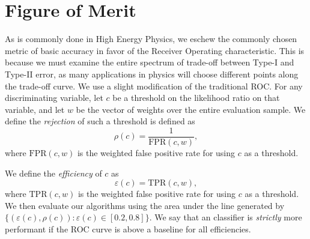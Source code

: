 \section{Figure of Merit} %
\label{sec:figure_of_merit}

As is commonly done in High Energy Physics, we eschew the commonly chosen metric of basic accuracy in favor of the Receiver Operating characteristic. This is because we must examine the entire spectrum of trade-off between Type-I and Type-II error, as many applications in physics will choose different points along the trade-off curve. We use a slight modification of the traditional ROC. For any discriminating variable, let $c$ be a threshold on the likelihood ratio on that variable, and let $w$ be the vector of weights over the entire evaluation sample. We define the \emph{rejection} of such a threshold is defined as 
$$
    \rho(c) = \frac{1}{\text{FPR}(c, w)},
$$
where $\text{FPR}(c, w)$ is the weighted false positive rate for using $c$ as a threshold.

We define the \emph{efficiency} of $c$ as 
$$
    \varepsilon(c) = \text{TPR}(c, w),
$$
where $\text{TPR}(c, w)$ is the weighted false positive rate for using $c$ as a threshold. We then evaluate our algorithms using the area under the line generated by $\{(\varepsilon(c), \rho(c)) : \varepsilon(c)\in [0.2, 0.8]\}$. We say that an classifier is \emph{strictly} more performant if the ROC curve is above a baseline for all efficiencies.

